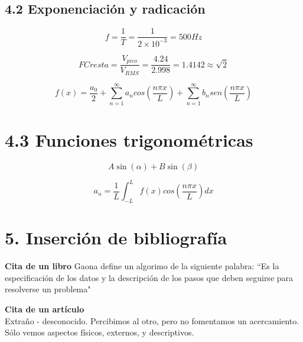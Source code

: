 \documentclass[11pt]{article} %
\begin{document}
     \subsection*{4.2 Exponenciaci\'on y radicaci\'on}
         \begin{equation}
             f=\frac{1}{T}=\frac{1}{2\times10^{-3}}=500Hz
             \label{ec_FFT}
         \end{equation}
         
         \begin{equation}
             FCresta=\frac{V_{pico}}{V_{RMS}}=\frac{4.24}{2.998}=1.4142\approx \sqrt{2} 
             \label{E3_fc}
         \end{equation}
         
         \begin{equation}
             f(x)=\frac{a_{0}}{2} + \sum_{n=1}^{\infty} a_{n}cos(\frac{n\pi x}{L}) +\sum_{n=1}^\infty b_{n}sen(\frac{n\pi x}{L})
             \label{ec_FFT1}
     \end{equation}
     \section*{4.3 Funciones trigonom\'etricas}
         \begin{equation}
             A\sin(\alpha)+B\sin(\beta)
             \label{ec_superposicion}
         \end{equation}
         
         \begin{equation} 
             a_{n}=\frac{1}{L}\int_{-L}^{L}f(x)cos(\frac{n\pi x}{L})dx 
             \label{FFT_3}
        \end{equation}

     \section*{5. Inserci\'on de bibliograf\'ia}
     
     \textbf{Cita de un libro}
     Gaona define un algorimo de la siguiente palabra: ``Es la especificaci\'on de los datos y la descripci\'on
     de los pasos que deben seguirse para resolverse un problema" \cite{C1}
     
     \textbf{Cita de un artículo}\\
     Extraño - desconocido. Percibimos al otro, pero no fomentamos un acercamiento. Sólo vemos aspectos físicos, externos, y descriptivos. \cite{C2}
     
     \newpage


        
\end{document}
